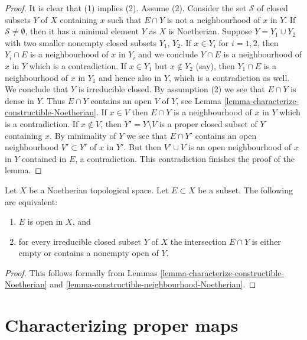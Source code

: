 \begin{proof}
It is clear that (1) implies (2). Assume (2).
Consider the set $\mathcal{S}$ of closed subsets $Y$ of $X$ containing $x$
such that $E \cap Y$ is not a neighbourhood of $x$ in $Y$.
If $\mathcal{S} \not = \emptyset$, then it has a minimal element $Y$
as $X$ is Noetherian. Suppose $Y = Y_1 \cup Y_2$ with two smaller nonempty
closed subsets $Y_1$, $Y_2$. If $x \in Y_i$ for $i = 1, 2$, then $Y_i \cap E$
is a neighbourhood of $x$ in $Y_i$ and we conclude $Y \cap E$ is a
neighbourhood of $x$ in $Y$ which is a contradiction. If $x \in Y_1$ but
$x \not\in Y_2$ (say), then $Y_1 \cap E$ is a neighbourhood of $x$ in
$Y_1$ and hence also in $Y$, which is a contradiction as well.
We conclude that $Y$ is irreducible closed. By assumption (2) we see that
$E \cap Y$ is dense in $Y$. Thus $E \cap Y$ contains an open $V$ of $Y$, see
Lemma \ref{lemma-characterize-constructible-Noetherian}.
If $x \in V$ then $E \cap Y$ is a neighbourhood of $x$ in $Y$ which
is a contradiction. If $x \not \in V$, then $Y' = Y \setminus V$ is a
proper closed subset of $Y$ containing $x$. By minimality of $Y$
we see that $E \cap Y'$ contains an open neighbourhood $V' \subset Y'$
of $x$ in $Y'$. But then $V' \cup V$ is an open neighbourhood of $x$
in $Y$ contained in $E$, a contradiction.
This contradiction finishes the proof of the lemma.
\end{proof}

\begin{lemma}
\label{lemma-characterize-open-Noetherian}
Let $X$ be a Noetherian topological space.
Let $E \subset X$ be a subset.
The following are equivalent:
\begin{enumerate}
\item $E$ is open in $X$, and
\item for every irreducible closed subset $Y$ of $X$
the intersection $E \cap Y$ is either empty or
contains a nonempty open of $Y$.
\end{enumerate}
\end{lemma}

\begin{proof}
This follows formally from
Lemmas \ref{lemma-characterize-constructible-Noetherian} and
\ref{lemma-constructible-neighbourhood-Noetherian}.
\end{proof}







\section{Characterizing proper maps}
\label{section-proper}

